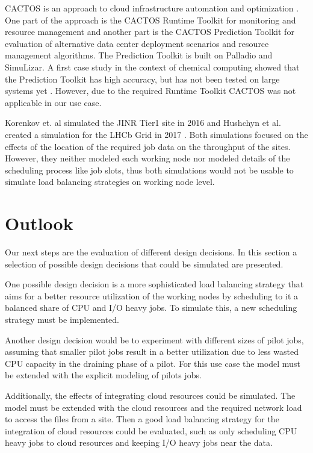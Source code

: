 \documentclass{webofc}
\begin{document}
CACTOS is an approach to cloud infrastructure automation and optimization \cite{cactos}.
One part of the approach is the CACTOS Runtime Toolkit for monitoring and resource management and another part is the CACTOS Prediction Toolkit for evaluation of alternative data center deployment scenarios and resource management algorithms. The Prediction Toolkit is built on Palladio and SimuLizar.
A first case study in the context of chemical computing showed that the Prediction Toolkit has high accuracy, but has not been tested on large systems yet \cite{rapidtesting}. However, due to the required Runtime Toolkit CACTOS was not applicable in our use case.

Korenkov et. al simulated the JINR Tier1 site in 2016 \cite{jinr} and Hushchyn et al. created a simulation for the LHCb Grid in 2017 \cite{lhcb}. Both simulations focused on the effects of the location of the required job data on the throughput of the sites.
However, they neither modeled each working node nor modeled details of the scheduling process like job slots, thus both simulations would not be usable to simulate load balancing strategies on working node level.


\section{Outlook}
\label{outlook}
Our next steps are the evaluation of different design decisions. In this section a selection of possible design decisions that could be simulated are presented.

One possible design decision is a more sophisticated load balancing strategy that aims for a better resource utilization of the working nodes by scheduling to it a balanced share of CPU and I/O heavy jobs. To simulate this, a new scheduling strategy must be implemented.

Another design decision would be to experiment with different sizes of pilot jobs, assuming that smaller pilot jobs result in a better utilization due to less wasted CPU capacity in the draining phase of a pilot. For this use case the model must be extended with the explicit modeling of pilots jobs.

Additionally, the effects of integrating cloud resources could be simulated. The model must be extended with the cloud resources and the required network load to access the files from a site. Then a good load balancing strategy for the  integration of cloud resources could be evaluated, such as only scheduling CPU heavy jobs to cloud resources and keeping I/O heavy jobs near the data.
\end{document}
